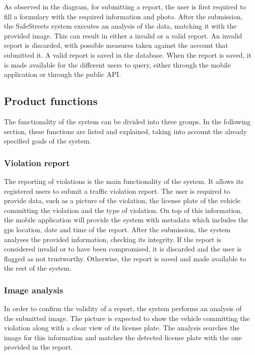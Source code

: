As observed in the diagram, for submitting a report, the user is first required to fill a formulary with the required information and photo. After the submission, the SafeStreets system executes an analysis of the data, matching it with the provided image. This can result in either a invalid or a valid report. An invalid report is discarded, with possible measures taken against the account that submitted it. A valid report is saved in the database. When the report is saved, it is made available for the different users to query, either through the mobile application or through the public API.

\subsection{Product functions}
The functionality of the system can be divided into three groups. In the following section, these functions are listed and explained, taking into account the already specified goals of the system.

\subsubsection{Violation report}
The reporting of violations is the main functionality of the system. It allows its registered users to submit a traffic violation report. The user is required to provide data, such as a picture of the violation, the license plate of the vehicle committing the violation and the type of violation. On top of this information, the mobile application will provide the system with metadata which includes the gps location, date and time of the report.
After the submission, the system analyses the provided information, checking its integrity. If the report is considered invalid or to have been compromised, it is discarded and the user is flagged as not trustworthy. Otherwise, the report is saved and made available to the rest of the system.

\subsubsection{Image analysis}
In order to confirm the validity of a report, the system performs an analysis of the submitted image. The picture is expected to show the vehicle committing the violation along with a clear view of its license plate. The analysis searches the image for this information and matches the detected license plate with the one provided in the report.

